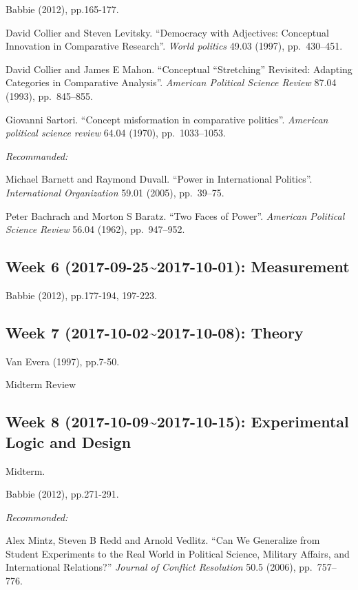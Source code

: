 \documentclass[11pt,]{article}
\begin{document}
Babbie (2012), pp.165-177.

David Collier and Steven Levitsky. ``Democracy with Adjectives:
Conceptual Innovation in Comparative Research''. \emph{World politics}
49.03 (1997), pp.~430--451.

David Collier and James E Mahon. ``Conceptual ``Stretching'' Revisited:
Adapting Categories in Comparative Analysis''.
\emph{American Political Science Review} 87.04 (1993), pp.~845--855.

Giovanni Sartori. ``Concept misformation in comparative politics''.
\emph{American political science review} 64.04 (1970), pp.~1033--1053.

\emph{Recommanded:}

Michael Barnett and Raymond Duvall. ``Power in International Politics''.
\emph{International Organization} 59.01 (2005), pp.~39--75.

Peter Bachrach and Morton S Baratz. ``Two Faces of Power''.
\emph{American Political Science Review} 56.04 (1962), pp.~947--952.

\subsection{Week 6 (2017-09-25\textasciitilde{}2017-10-01):
Measurement}\label{week-6-2017-09-252017-10-01-measurement}

Babbie (2012), pp.177-194, 197-223.

\subsection{Week 7 (2017-10-02\textasciitilde{}2017-10-08):
Theory}\label{week-7-2017-10-022017-10-08-theory}

Van Evera (1997), pp.7-50.

Midterm Review

\subsection{Week 8 (2017-10-09\textasciitilde{}2017-10-15): Experimental
Logic and
Design}\label{week-8-2017-10-092017-10-15-experimental-logic-and-design}

Midterm.

Babbie (2012), pp.271-291.

\emph{Recommonded:}

Alex Mintz, Steven B Redd and Arnold Vedlitz. ``Can We Generalize from
Student Experiments to the Real World in Political Science, Military
Affairs, and International Relations?''
\emph{Journal of Conflict Resolution} 50.5 (2006), pp.~757--776.
\end{document}

